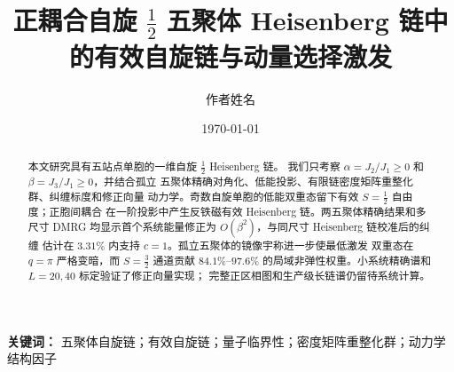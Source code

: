 \documentclass[UTF8,zihao=-4]{ctexart}
\title{正耦合自旋 $\frac{1}{2}$ 五聚体 Heisenberg 链中的有效自旋链与动量选择激发}
\author{作者姓名}
\date{\today}
\begin{document}
\maketitle

\begin{abstract}
本文研究具有五站点单胞的一维自旋 $\frac{1}{2}$ Heisenberg 链。
我们只考察 $\alpha=J_2/J_1\geq0$ 和 $\beta=J_3/J_1\geq0$，并结合孤立
五聚体精确对角化、低能投影、有限链密度矩阵重整化群、纠缠标度和修正向量
动力学。奇数自旋单胞的低能双重态留下有效 $S=\frac12$ 自由度；正胞间耦合
在一阶投影中产生反铁磁有效 Heisenberg 链。两五聚体精确结果和多尺寸 DMRG
均显示首个系统能量修正为 $O(\beta^2)$，与同尺寸 Heisenberg 链校准后的纠缠
估计在 $3.31\%$ 内支持 $c=1$。孤立五聚体的镜像宇称进一步使最低激发
双重态在 $q=\pi$ 严格变暗，而 $S=\frac32$ 通道贡献 $84.1\%$--$97.6\%$
的局域非弹性权重。小系统精确谱和 $L=20,40$ 标定验证了修正向量实现；
完整正区相图和生产级长链谱仍留待系统计算。
\end{abstract}

\noindent\textbf{关键词：}
五聚体自旋链；有效自旋链；量子临界性；密度矩阵重整化群；动力学结构因子

\tableofcontents







\printbibliography[title={参考文献}]
\end{document}
